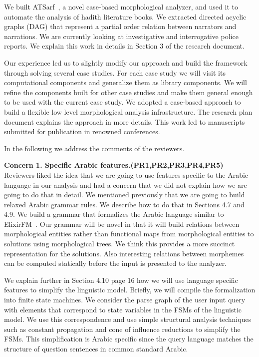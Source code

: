 \documentclass[12pt]{article}
\begin{document}
We built ATSarf~\cite{ATMine09}, 
a novel case-based morphological analyzer,
and used it to automate the analysis of 
hadith literature books. 
We extracted directed acyclic graphs (DAG) that 
represent a partial order relation between narrators and narrations.
We are currently looking at investigative and interrogative police 
reports.
We explain this work in details in Section 3 of the research document.

Our experience led us to slightly modify our approach and 
build the framework through solving several case studies.
For each case study we will visit its computational components 
and generalize them as library components. 
We will refine the components built for other case studies
and make them general enough to be used with the current case study.
We adopted a case-based approach to build a flexible
low level morphological analysis infrastructure.
The research plan document explains the approach in more details. 
This work led to manuscripts submitted for publication in 
renowned conferences. 

In the following we address the comments of the reviewers.

{\bf Concern 1. Specific Arabic features.(PR1,PR2,PR3,PR4,PR5)~~}
Reviewers liked the idea that we are going to use 
features specific to the Arabic language in our analysis and had
a concern that we did not explain how we are going to do that in 
detail. 
We mentioned previously that we are going to build relaxed
Arabic grammar rules.
We describe how to do that in Sections 4.7 and 4.9. 
We build a grammar that formalizes the Arabic language similar to 
ElixirFM~\cite{Otakar:07}.
Our grammar will be novel in that it will build relations between
morphological entities rather than
functional maps from morphological entities to solutions
using morphological trees. 
We think this provides a more succinct
representation for the solutions. Also interesting relations 
between morphemes can be computed statically before
the input is presented to the analyzer.

We explain further in Section 4.10 page 16 how we will
use language specific features to simplify the linguistic model. 
Briefly, we will compile the formalization into finite state 
machines.
We consider the parse graph of the user input query with
elements that correspond to state variables in the FSMs of
the linguistic model. 
We use this correspondence and use simple structural analysis 
techniques such as constant propagation and cone of influence
reductions to simplify the FSMs. 
This simplification is Arabic specific since
the query language matches the structure of question sentences 
in common standard Arabic.
\end{document}
